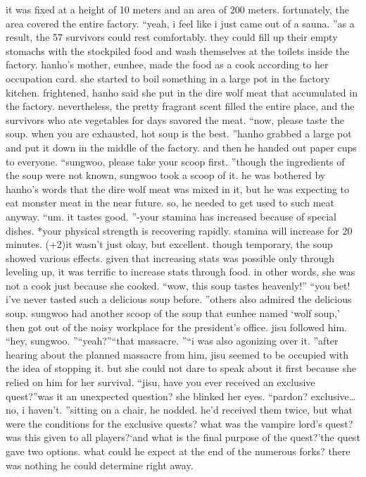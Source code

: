 it was fixed at a height of 10 meters and an area of 200 meters.
 fortunately, the area covered the entire factory.
“yeah, i feel like i just came out of a sauna.
”as a result, the 57 survivors could rest comfortably.
 they could fill up their empty stomachs with the stockpiled food and wash themselves at the toilets inside the factory.
hanho’s mother, eunhee, made the food as a cook according to her occupation card.
 she started to boil something in a large pot in the factory kitchen.
frightened, hanho said she put in the dire wolf meat that accumulated in the factory.
nevertheless, the pretty fragrant scent filled the entire place, and the survivors who ate vegetables for days savored the meat.
“now, please taste the soup.
 when you are exhausted, hot soup is the best.
”hanho grabbed a large pot and put it down in the middle of the factory.
 and then he handed out paper cups to everyone.
“sungwoo, please take your scoop first.
”though the ingredients of the soup were not known, sungwoo took a scoop of it.
he was bothered by hanho’s words that the dire wolf meat was mixed in it, but he was expecting to eat monster meat in the near future.
 so, he needed to get used to such meat anyway.
“um.
 it tastes good.
”-your stamina has increased because of special dishes.
*your physical strength is recovering rapidly.
stamina will increase for 20 minutes.
 (+2)it wasn’t just okay, but excellent.
 though temporary, the soup showed various effects.
given that increasing stats was possible only through leveling up, it was terrific to increase stats through food.
 in other words, she was not a cook just because she cooked.
“wow, this soup tastes heavenly!”
“you bet! i’ve never tasted such a delicious soup before.
”others also admired the delicious soup.
sungwoo had another scoop of the soup that eunhee named ‘wolf soup,’ then got out of the noisy workplace for the president’s office.
 jisu followed him.
“hey, sungwoo.
”“yeah?”“that massacre.
”“i was also agonizing over it.
”after hearing about the planned massacre from him, jisu seemed to be occupied with the idea of stopping it.
 but she could not dare to speak about it first because she relied on him for her survival.
“jisu, have you ever received an exclusive quest?”was it an unexpected question? she blinked her eyes.
“pardon? exclusive…no, i haven’t.
”sitting on a chair, he nodded.
 he’d received them twice, but what were the conditions for the exclusive quests? what was the vampire lord’s quest? was this given to all players?‘and what is the final purpose of the quest?’the quest gave two options.
 what could he expect at the end of the numerous forks? there was nothing he could determine right away.
